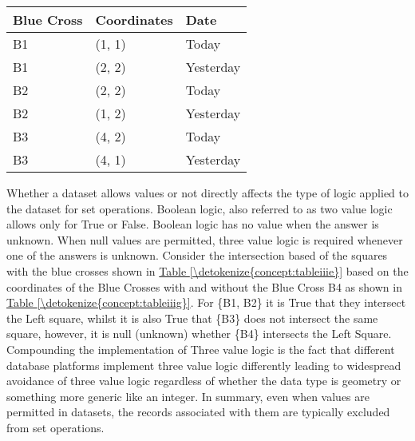 \documentclass[letterpaper,10pt,english]{sphinxmanual}
\begin{document}
\begin{savenotes}\sphinxattablestart
\centering
{}
\label{\detokenize{concept:id51}}\label{\detokenize{concept:tableiiif}}
\sphinxaftercaption
\begin{tabulary}{\linewidth}[t]{|T|T|T|}
\hline
\sphinxstyletheadfamily 
Blue Cross
&\sphinxstyletheadfamily 
Coordinates
&\sphinxstyletheadfamily 
Date
\\
\hline
B1
&
(1, 1)
&
Today
\\
\hline
B1
&
(2, 2)
&
Yesterday
\\
\hline
B2
&
(2, 2)
&
Today
\\
\hline
B2
&
(1, 2)
&
Yesterday
\\
\hline
B3
&
(4, 2)
&
Today
\\
\hline
B3
&
(4, 1)
&
Yesterday
\\
\hline
\end{tabulary}
\par
\sphinxattableend\end{savenotes}

Whether a dataset allows  values or not directly affects the type of logic applied to the dataset for set operations.  Boolean logic, also referred to as two value logic allows only for True or False.  Boolean logic has no value when the answer is unknown.  When null values are permitted, three value logic is required whenever one of the answers is unknown.  Consider the intersection based of the squares with the blue crosses shown in  \hyperref[\detokenize{concept:tableiiie}]{Table \ref{\detokenize{concept:tableiiie}}} based on the coordinates of the Blue Crosses with and without the Blue Cross B4 as shown in \hyperref[\detokenize{concept:tableiiig}]{Table \ref{\detokenize{concept:tableiiig}}}.  For \{B1, B2\} it is True that they intersect the Left square, whilst it is also True that \{B3\} does not intersect the same square, however, it is null (unknown) whether \{B4\} intersects the Left Square.  Compounding the implementation of Three value logic is the fact that different database platforms implement three value logic differently leading to widespread avoidance of three value logic regardless of whether the data type is geometry or something more generic like an integer.  In summary, even when  values are permitted in datasets, the records associated with them are typically excluded from set operations.
\end{document}
